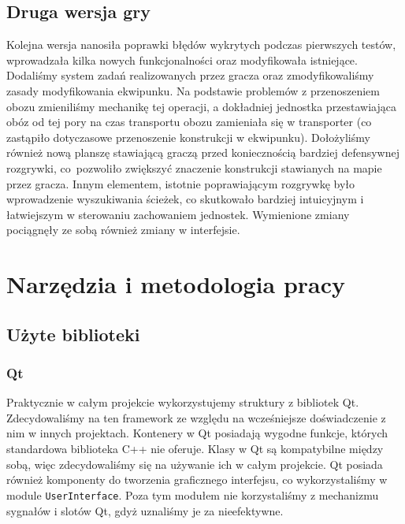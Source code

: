 \documentclass[licencjacka]{pracamgr}
\begin{document}
    \section{Druga wersja gry}
    Kolejna wersja nanosiła poprawki błędów wykrytych podczas pierwszych testów, wprowadzała kilka nowych funkcjonalności
    oraz modyfikowała istniejące. Dodaliśmy system zadań realizowanych przez gracza oraz zmodyfikowaliśmy zasady modyfikowania
    ekwipunku. Na podstawie problemów z przenoszeniem obozu zmieniliśmy mechanikę tej operacji, a dokładniej jednostka przestawiająca 
    obóz od tej pory na czas transportu obozu zamieniała się w transporter (co zastąpiło dotyczasowe przenoszenie konstrukcji w ekwipunku).
    Dołożyliśmy również nową planszę stawiającą graczą przed koniecznością bardziej defensywnej rozgrywki,
    co~pozwoliło zwiększyć znaczenie konstrukcji stawianych na mapie przez gracza. Innym elementem, istotnie poprawiającym
    rozgrywkę było wprowadzenie wyszukiwania ścieżek, co skutkowało bardziej intuicyjnym i łatwiejszym w sterowaniu
    zachowaniem jednostek. Wymienione zmiany pociągnęły ze sobą również zmiany w interfejsie.

\chapter{Narzędzia i metodologia pracy}
  \section{Użyte biblioteki}
    \subsection{Qt}
    Praktycznie w całym projekcie wykorzystujemy struktury z bibliotek Qt. Zdecydowaliśmy na ten framework ze względu
    na wcześniejsze doświadczenie z nim w innych projektach. Kontenery w Qt posiadają wygodne funkcje, których
    standardowa biblioteka C++ nie oferuje.
    Klasy w Qt są kompatybilne między sobą, więc zdecydowaliśmy się na używanie ich w całym projekcie.
    Qt posiada również komponenty do tworzenia graficznego interfejsu, co wykorzystaliśmy w module \texttt{UserInterface}.
    Poza tym modułem nie korzystaliśmy z mechanizmu sygnałów i slotów Qt, gdyż uznaliśmy je za nieefektywne.
\end{document}

